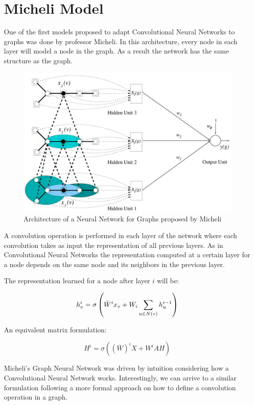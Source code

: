 \newpage

\section{Micheli Model}

One of the first models proposed to adapt Convolutional Neural Networks to graphs was done by professor Micheli. In this architecture, every node in each layer will model a node in the graph. As a result the network has the same structure as the graph.

\begin{figure}[h]
    \centering
    \includegraphics[width=12cm]{Images/nn4g-micheli.png}
    \caption{Architecture of a Neural Network for Graphs proposed by Micheli}
\end{figure}


\noindent A convolution operation is performed in each layer of the network where each convolution takes as input the representation of all previous layers. As in Convolutional Neural Networks the representation computed at a certain layer for a node depends on the same node and its neighbors in the previous layer.

\noindent The representation learned for a node after layer $i$ will be:

$$ h_v^{i} = \sigma \left( \Bar{W}^{i} x_v + W_i \sum_{u \in N(v)} h_{u}^{i-1} \right) $$

\noindent An equivalent matrix formulation:

$$ H^{i} =   \sigma \left(     (\overline{W})^{i} X + W^{i} A H  \right) $$

\noindent Micheli's Graph Neural Network was driven by intuition considering how a Convolutional Neural Network works. Interestingly, we can arrive to a similar formulation following a more formal approach on how to define a convolution operation in a graph.

